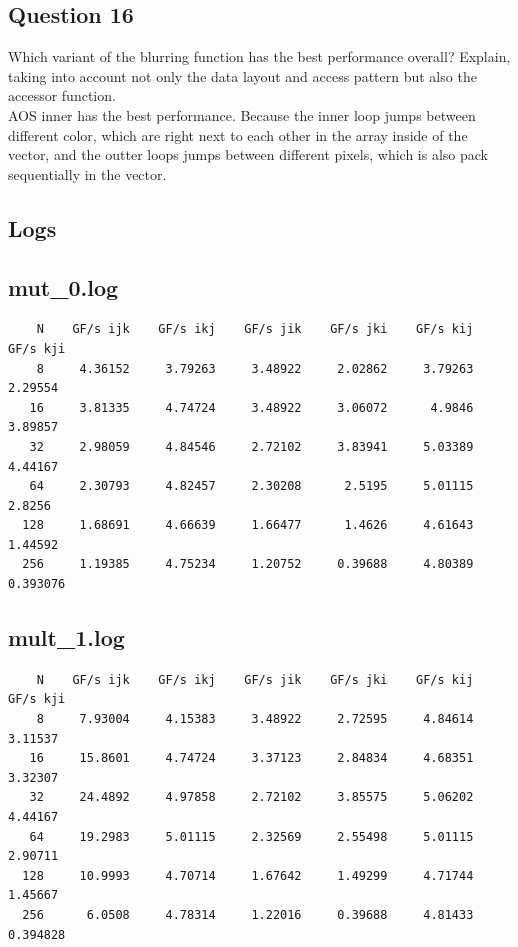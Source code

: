 \documentclass[]{article}
\begin{document}
\subsection*{Question 16}
    Which variant of the blurring function has the best performance overall? Explain, taking into account not only the data layout and access pattern but also the accessor function.
    \\[1.1em]
    AOS inner has the best performance. Because the inner loop jumps between different color, which are right next to each other in the array inside of the vector, and the outter loops jumps between different pixels, which is also pack sequentially in the vector. 

\subsection*{Logs}
    \subsection*{mut\_0.log}
        \begin{lstlisting}
    N    GF/s ijk    GF/s ikj    GF/s jik    GF/s jki    GF/s kij    GF/s kji
    8     4.36152     3.79263     3.48922     2.02862     3.79263     2.29554
   16     3.81335     4.74724     3.48922     3.06072      4.9846     3.89857
   32     2.98059     4.84546     2.72102     3.83941     5.03389     4.44167
   64     2.30793     4.82457     2.30208      2.5195     5.01115      2.8256
  128     1.68691     4.66639     1.66477      1.4626     4.61643     1.44592
  256     1.19385     4.75234     1.20752     0.39688     4.80389    0.393076 
        \end{lstlisting}
    \subsection*{mult\_1.log}
        \begin{lstlisting}
    N    GF/s ijk    GF/s ikj    GF/s jik    GF/s jki    GF/s kij    GF/s kji
    8     7.93004     4.15383     3.48922     2.72595     4.84614     3.11537
   16     15.8601     4.74724     3.37123     2.84834     4.68351     3.32307
   32     24.4892     4.97858     2.72102     3.85575     5.06202     4.44167
   64     19.2983     5.01115     2.32569     2.55498     5.01115     2.90711
  128     10.9993     4.70714     1.67642     1.49299     4.71744     1.45667
  256      6.0508     4.78314     1.22016     0.39688     4.81433    0.394828     
        \end{lstlisting}
\end{document}
